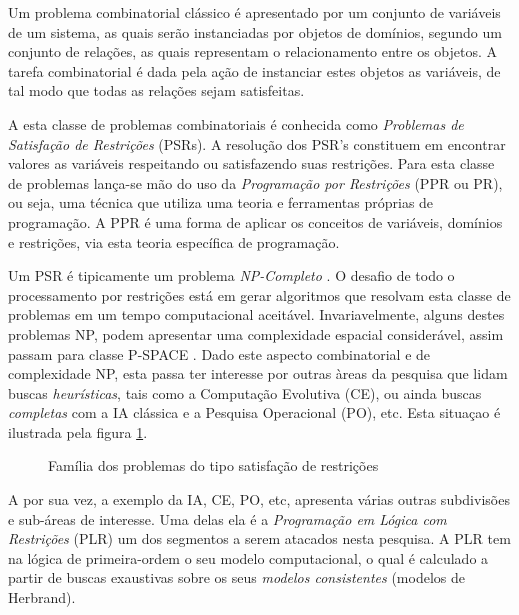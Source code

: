 Um problema combinatorial cl\'assico é apresentado por um conjunto de vari\'aveis de um sistema,  as quais  ser\~ao instanciadas por objetos de domínios, segundo um conjunto de relaç\~oes, as quais representam o relacionamento entre os objetos. A tarefa combinatorial
é dada pela aç\~ao de instanciar estes objetos as variáveis, de tal modo que todas as 
relaç\~oes sejam satisfeitas.

A esta classe de problemas combinatoriais é conhecida como \textit{Problemas de Satisfação de Restrições} (PSRs). A resoluç\~ao dos PSR's constituem em encontrar valores as variáveis
respeitando ou satisfazendo suas restrições. Para esta classe de problemas lança-se mão do uso da \textit{Programação por Restrições} (PPR ou PR), ou seja, uma técnica que utiliza uma teoria e  ferramentas pr\'oprias de  programação. A PPR é uma forma de aplicar os conceitos de variáveis, domínios e restrições, via esta teoria específica de programação. 

Um PSR é tipicamente um problema \textit{NP-Completo} \cite{rossi_2006}. O desafio de todo o processamento por restrições está em gerar algoritmos que resolvam esta classe de problemas em um tempo
computacional aceitável. Invariavelmente, alguns destes problemas NP, podem apresentar uma
complexidade espacial consider\'avel, assim passam para classe P-SPACE \cite{sipser12}.
Dado este aspecto combinatorial e de complexidade NP, esta passa ter interesse
por outras àreas da pesquisa que lidam buscas \textit{heurísticas}, tais como a Computação Evolutiva (CE),
 ou ainda buscas \textit{completas} com a IA clássica e a Pesquisa Operacional (PO), etc. Esta situaçao é ilustrada pela figura \ref{fig:eureka}.


\begin{figure}[!ht]
\begin{center}
  \caption{Família dos problemas do tipo satisfação de restrições}
\label{fig:eureka}
\end{center}
\end{figure}


A \PR por sua vez, a exemplo da IA, CE, PO, etc, apresenta várias outras
subdivisões e sub-áreas de interesse.  Uma delas ela é a \textit{Programação em Lógica com Restrições} (PLR) um dos segmentos a serem atacados nesta pesquisa. A PLR tem na lógica de primeira-ordem 
o seu modelo computacional, o qual é calculado a partir de buscas exaustivas sobre
os seus \textit{modelos consistentes} (modelos de Herbrand).

